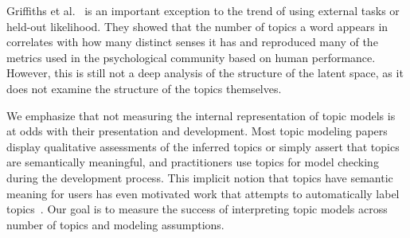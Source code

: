 Griffiths et al.~\cite{griffiths-06} is an important exception to the
trend of using external tasks or held-out likelihood.  They showed
that the number of topics a word appears in correlates with how many
distinct senses it has and reproduced many of the metrics used in the
psychological community based on human performance.  However, this is
still not a deep analysis of the structure of the latent space, as it
does not examine the structure of the topics themselves.

We emphasize that not measuring the internal representation of topic
models is at odds with their presentation and development.  Most topic
modeling papers display qualitative assessments of the inferred topics
or simply assert that topics are semantically meaningful, and
practitioners use topics for model checking during the development
process.  This implicit notion that topics have semantic meaning for
users has even motivated work that attempts to automatically label
topics~\cite{mei-07}.  Our goal is to measure the success of
interpreting topic models across number of topics and modeling
assumptions.
